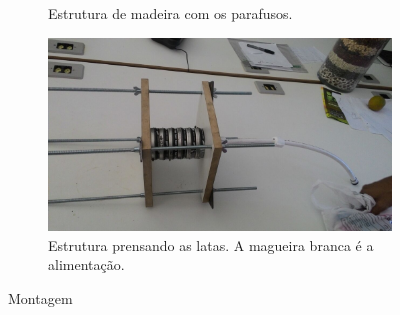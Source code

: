 \begin{figure}
\begin{subfigure}[H]{0.4\textwidth}
    \caption{Estrutura de madeira com os parafusos.}
  \end{subfigure}%
  \hfill
  \begin{subfigure}[H]{0.4\textwidth}
    \includegraphics[width=\textwidth]{figuras/montagem2.png}
    \caption{Estrutura prensando as latas. A magueira branca é a alimentação.}
  \end{subfigure}%
  \caption{Montagem}
\end{figure}


